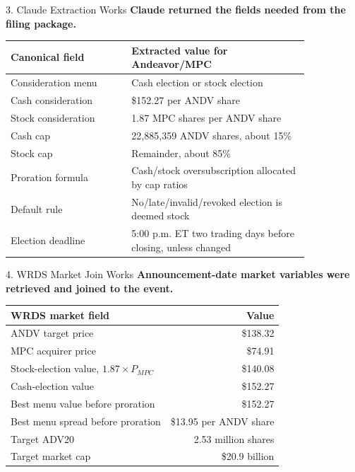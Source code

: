 \documentclass[aspectratio=169,11pt]{beamer}
\newcommand{\usd}[1]{\$#1}
\begin{document}
\begin{frame}{3. Claude Extraction Works}
\small
\textbf{Claude returned the fields needed from the filing package.}

\vspace{0.5em}
\begin{tabular}{p{0.34\linewidth}p{0.50\linewidth}}
\toprule
\textbf{Canonical field} & \textbf{Extracted value for Andeavor/MPC} \\
\midrule
Consideration menu & Cash election or stock election \\
Cash consideration & \usd{152.27} per ANDV share \\
Stock consideration & 1.87 MPC shares per ANDV share \\
Cash cap & 22,885,359 ANDV shares, about 15\% \\
Stock cap & Remainder, about 85\% \\
Proration formula & Cash/stock oversubscription allocated by cap ratios \\
Default rule & No/late/invalid/revoked election is deemed stock \\
Election deadline & 5:00 p.m. ET two trading days before closing, unless changed \\
\bottomrule
\end{tabular}
\end{frame}

\begin{frame}{4. WRDS Market Join Works}
\small
\textbf{Announcement-date market variables were retrieved and joined to the event.}

\vspace{0.5em}
\begin{tabular}{lr}
\toprule
\textbf{WRDS market field} & \textbf{Value} \\
\midrule
ANDV target price & \usd{138.32} \\
MPC acquirer price & \usd{74.91} \\
Stock-election value, $1.87 \times P_{MPC}$ & \usd{140.08} \\
Cash-election value & \usd{152.27} \\
Best menu value before proration & \usd{152.27} \\
Best menu spread before proration & \usd{13.95} per ANDV share \\
Target ADV20 & 2.53 million shares \\
Target market cap & \usd{20.9} billion \\
\bottomrule
\end{tabular}
\end{frame}
\end{document}
